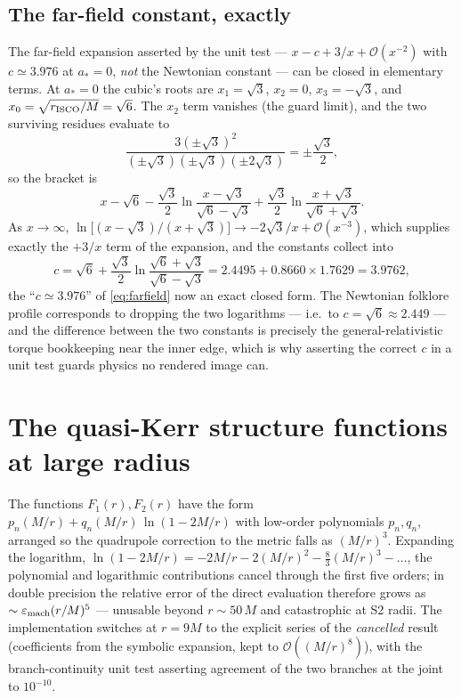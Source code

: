 \subsection{The far-field constant, exactly}
\label{app:farfield}

The far-field expansion asserted by the unit test —
$x - c + 3/x + \mathcal{O}(x^{-2})$ with $c \simeq 3.976$ at
$a_* = 0$, \emph{not} the Newtonian constant — can be closed in
elementary terms. At $a_* = 0$ the cubic's roots are
$x_1 = \sqrt3$, $x_2 = 0$, $x_3 = -\sqrt3$, and
$x_0 = \sqrt{r_{\rm ISCO}/M} = \sqrt6$. The $x_2$ term vanishes (the
guard limit), and the two surviving residues evaluate to
\begin{equation}
\frac{3(\pm\sqrt3)^2}{(\pm\sqrt3)(\pm\sqrt3)(\pm2\sqrt3)}
= \pm\frac{\sqrt3}{2},
\end{equation}
so the bracket is
\begin{equation}
x - \sqrt6
- \frac{\sqrt3}{2}\ln\frac{x-\sqrt3}{\sqrt6-\sqrt3}
+ \frac{\sqrt3}{2}\ln\frac{x+\sqrt3}{\sqrt6+\sqrt3} .
\end{equation}
As $x \to \infty$,
$\ln\bigl[(x-\sqrt3)/(x+\sqrt3)\bigr] \to -2\sqrt3/x + \mathcal
O(x^{-3})$, which supplies exactly the $+3/x$ term of the expansion,
and the constants collect into
\begin{equation}
c = \sqrt6 + \frac{\sqrt3}{2}
\ln\frac{\sqrt6+\sqrt3}{\sqrt6-\sqrt3}
= 2.4495 + 0.8660\times1.7629 = 3.9762 ,
\label{eq:farfieldc}
\end{equation}
the ``$c \simeq 3.976$'' of \eqref{eq:farfield} now an exact closed
form. The Newtonian folklore profile corresponds to dropping the two
logarithms — i.e.\ to $c = \sqrt6 \approx 2.449$ — and the difference
between the two constants is precisely the general-relativistic
torque bookkeeping near the inner edge, which is why asserting the
correct $c$ in a unit test guards physics no rendered image can.

\section{The quasi-Kerr structure functions at large radius}
\label{app:htseries}

The \citet{GlampedakisBabak2006} functions $F_1(r), F_2(r)$ have the
form $p_n(M/r) + q_n(M/r)\,\ln(1 - 2M/r)$ with low-order polynomials
$p_n, q_n$, arranged so the quadrupole correction to the metric falls
as $(M/r)^3$. Expanding the logarithm,
$\ln(1-2M/r) = -2M/r - 2(M/r)^2 - \tfrac83(M/r)^3 - \dots$, the
polynomial and logarithmic contributions cancel through the first five
orders; in double precision the relative error of the direct evaluation
therefore grows as $\sim \varepsilon_{\rm mach}(r/M)^5$ — unusable
beyond $r \sim 50\,M$ and catastrophic at S2 radii. The implementation
switches at $r = 9M$ to the explicit series of the \emph{cancelled}
result (coefficients from the symbolic expansion, kept to
$\mathcal{O}((M/r)^8)$), with the branch-continuity unit test asserting
agreement of the two branches at the joint to $10^{-10}$.

